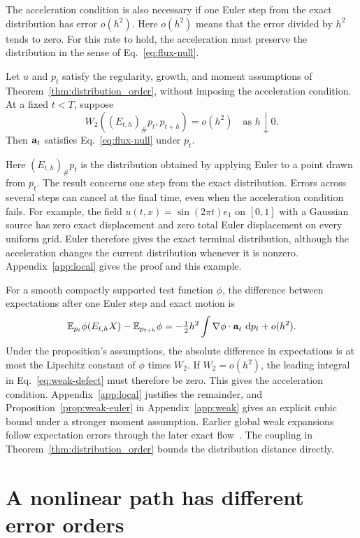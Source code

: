 The acceleration condition is also necessary if one Euler step from the exact distribution has error $o(h^2)$. Here $o(h^2)$ means that the error divided by $h^2$ tends to zero. For this rate to hold, the acceleration must preserve the distribution in the sense of Eq.~\eqref{eq:flux-null}.
\begin{proposition}
\label{prop:local-converse}
Let $u$ and $p_t$ satisfy the regularity, growth, and moment assumptions of Theorem~\ref{thm:distribution_order}, without imposing the acceleration condition. At a fixed $t<T$, suppose
\[
 W_2((E_{t,h})_\#p_t,p_{t+h})=o(h^2)
 \quad\text{as }h\downarrow0.
\]
Then $\mathbf a_t$ satisfies Eq.~\eqref{eq:flux-null} under $p_t$.
\end{proposition}
Here $(E_{t,h})_\#p_t$ is the distribution obtained by applying Euler to a point drawn from $p_t$. The result concerns one step from the exact distribution. Errors across several steps can cancel at the final time, even when the acceleration condition fails. For example, the field $u(t,x)=\sin(2\pi t)e_1$ on $[0,1]$ with a Gaussian source has zero exact displacement and zero total Euler displacement on every uniform grid. Euler therefore gives the exact terminal distribution, although the acceleration changes the current distribution whenever it is nonzero. Appendix~\ref{app:local} gives the proof and this example.

For a smooth compactly supported test function $\phi$, the difference between expectations after one Euler step and exact motion is
\begin{equation}
 \mathbb E_{p_t}\phi(E_{t,h}X)-\mathbb E_{p_{t+h}}\phi
 =-\tfrac12h^2\int\nabla\phi\cdot\mathbf a_t\,\,\mathrm d p_t+o(h^2).
 \label{eq:weak-defect}
\end{equation}
Under the proposition's assumptions, the absolute difference in expectations is at most the Lipschitz constant of $\phi$ times $W_2$. If $W_2=o(h^2)$, the leading integral in Eq.~\eqref{eq:weak-defect} must therefore be zero. This gives the acceleration condition. Appendix~\ref{app:local} justifies the remainder, and Proposition~\ref{prop:weak-euler} in Appendix~\ref{app:weak} gives an explicit cubic bound under a stronger moment assumption. Earlier global weak expansions follow expectation errors through the later exact flow~\citep{talay1990expansion,hurault2026geometry}. The coupling in Theorem~\ref{thm:distribution_order} bounds the distribution distance directly.

\section{A nonlinear path has different error orders}
\label{sec:nonlinear}

